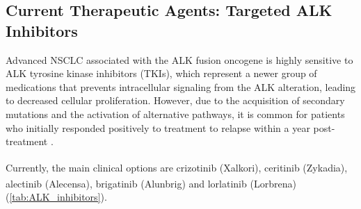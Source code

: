 \subsection{Current Therapeutic Agents: Targeted ALK Inhibitors}

Advanced NSCLC associated with the ALK fusion oncogene is highly sensitive to ALK tyrosine kinase inhibitors (TKIs), which represent a newer group of medications that prevents intracellular signaling from the ALK alteration, leading to decreased cellular proliferation. However, due to the acquisition of secondary mutations and the activation of alternative pathways, it is common for patients who initially responded positively to treatment to relapse within a year post-treatment \cite{NSCLC_therapies}. 

Currently, the main clinical options are crizotinib (Xalkori\textsuperscript\textregistered), ceritinib (Zykadia\textsuperscript\textregistered), alectinib (Alecensa\textsuperscript\textregistered), brigatinib (Alunbrig\textsuperscript\textregistered) and lorlatinib (Lorbrena\textsuperscript\textregistered) (\autoref{tab:ALK_inhibitors}).

